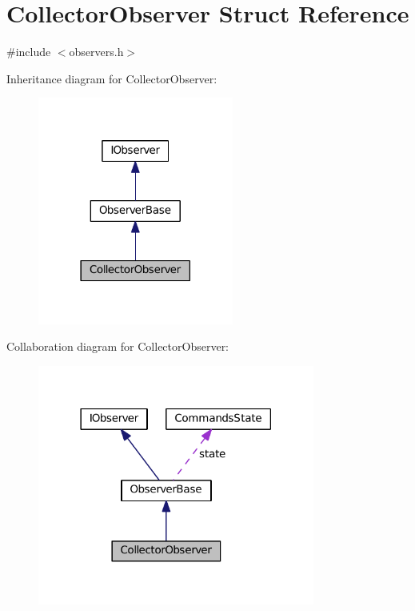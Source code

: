 \hypertarget{struct_collector_observer}{}\section{Collector\+Observer Struct Reference}
\label{struct_collector_observer}


{\ttfamily \#include $<$observers.\+h$>$}



Inheritance diagram for Collector\+Observer\+:
\nopagebreak
\begin{figure}[H]
\begin{center}
\leavevmode
\includegraphics[width=182pt]{struct_collector_observer__inherit__graph}
\end{center}
\end{figure}


Collaboration diagram for Collector\+Observer\+:
\nopagebreak
\begin{figure}[H]
\begin{center}
\leavevmode
\includegraphics[width=258pt]{struct_collector_observer__coll__graph}
\end{center}
\end{figure}
